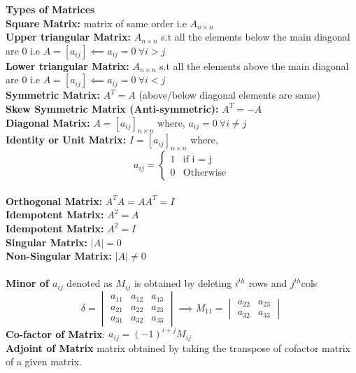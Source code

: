 \documentclass[12pt]{article}
\begin{document}
\textbf{Types of Matrices}\\
\textbf{Square Matrix: } matrix of same order i.e $A_{n \times n}$\\
\textbf{Upper triangular Matrix: } $A_{n \times n}$ s.t all the elements below the main diagonal are $0$ i.e $A = [a_{ij}] \impliedby a_{ij}=0\: \forall i>j$\\
\textbf{Lower triangular Matrix: } $A_{n \times n}$ s.t all the elements above the main diagonal are $0$ i.e $A = [a_{ij}] \impliedby a_{ij}=0\: \forall i<j$\\
\textbf{Symmetric Matrix: } $A^T = A$ (above/below diagonal elements are same)\\
\textbf{Skew Symmetric Matrix (Anti-symmetric): } $A^T=-A$\\
\textbf{Diagonal Matrix: } $A = [a_{ij}]_{n \times n}$ where, $a_{ij}=0\: \forall i\not = j$\\
\textbf{Identity or Unit Matrix: } $I = [a_{ij}]_{n \times n}$ where, 
\[ 
a_{ij}= \begin{cases}
	1 & \text{if i = j}\\
	0 & \text{Otherwise}
\end{cases}
\]\\
\textbf{Orthogonal Matrix: } $A^TA = AA^T=I$\\
\textbf{Idempotent Matrix: } $A^2 = A$\\
\textbf{Idempotent Matrix: } $A^2 = I$\\
\textbf{Singular Matrix: } $|A| = 0$\\
\textbf{Non-Singular Matrix: } $|A| \not= 0$\\
\\
\textbf{Minor of $a_{ij}$} denoted as $M_{ij}$ is obtained by deleting $i^{th}$ rows and $j^{th}$cols\\
\[
	\delta = \begin{vmatrix}
	a_{11} & a_{12} & a_{13} \\
	a_{21} & a_{22} & a_{23} \\
	a_{31} & a_{32} & a_{33} 
	\end{vmatrix}
	\implies
	M_{11} = \begin{vmatrix}
	 a_{22} & a_{23} \\
	 a_{32} & a_{33}
	\end{vmatrix}
\]
\textbf{Co-factor of Matrix}: $a_{ij} = (-1)^{i+j} M_{ij}$\\
\textbf{Adjoint of Matrix } matrix obtained by taking the transpose of cofactor matrix of a given matrix.\\
\end{document}
